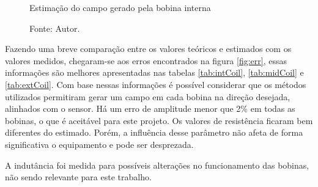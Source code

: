 \begin{figure}[H]
    \centering
     \caption{Estimação do campo gerado pela bobina interna}
     \caption*{Fonte: Autor.}\label{fig:CurFieldEx}
\end{figure}
Fazendo uma breve comparação entre os valores teóricos e estimados com os valores medidos, chegaram-se aos erros encontrados na figura \ref{fig:err}, essas informações são melhores apresentadas nas tabelas \ref{tab:intCoil}, \ref{tab:midCoil} e \ref{tab:extCoil}.
Com base nessas informações é possível considerar que os métodos utilizados permitiram gerar um campo em cada bobina na direção desejada, alinhados com o sensor. Há um erro de amplitude menor que 2\% em todas as bobinas, o que é aceitável para este projeto. Os valores de resistência ficaram bem diferentes do estimado. Porém, a influência desse parâmetro não afeta de forma significativa o equipamento e pode ser desprezada.

A indutância foi medida para possíveis alterações no funcionamento das bobinas, não sendo relevante para este trabalho. 

